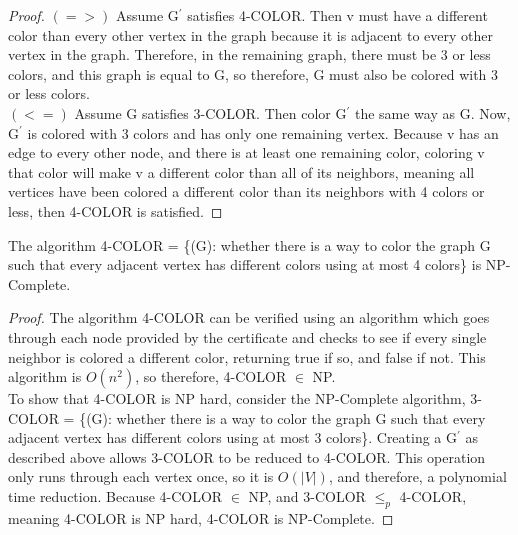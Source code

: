 \documentclass[12pt, letterpaper]{article}
\begin{document}
\begin{proof}
$(=>)$ Assume G$^\prime$ satisfies 4-COLOR. Then v must have a different color than every other vertex in the graph because it is adjacent to every other vertex in the graph. Therefore, in the remaining graph, there must be 3 or less colors, and this graph is equal to G, so therefore, G must also be colored with 3 or less colors.
\vspace{2mm} \\
$(<=)$ Assume G satisfies 3-COLOR. Then color G$^\prime$ the same way as G. Now, G$^\prime$ is colored with 3 colors and has only one remaining vertex. Because v has an edge to every other node, and there is at least one remaining color, coloring v that color will make v a different color than all of its neighbors, meaning all vertices have been colored a different color than its neighbors with 4 colors or less, then 4-COLOR is satisfied.
\end{proof}


The algorithm 4-COLOR = \{(G): whether there is a way to color the graph G such that every adjacent vertex has different colors using at most 4 colors\} is NP-Complete.

\begin{proof}
The algorithm 4-COLOR can be verified using an algorithm which goes through each node provided by the certificate and checks to see if every single neighbor is colored a different color, returning true if so, and false if not. This algorithm is $O(n^2)$, so therefore, 4-COLOR $\in$ NP. 
\vspace{2mm} \\
To show that 4-COLOR is NP hard, consider the NP-Complete algorithm, 3-COLOR = \{(G): whether there is a way to color the graph G such that every adjacent vertex has different colors using at most 3 colors\}. Creating a G$^\prime$ as described above allows 3-COLOR to be reduced to 4-COLOR. This operation only runs through each vertex once, so it is $O(|V|)$, and therefore, a polynomial time reduction. Because 4-COLOR $\in$ NP, and 3-COLOR $\le_p$ 4-COLOR, meaning 4-COLOR is NP hard, 4-COLOR is NP-Complete.
\end{proof}
\end{document}
